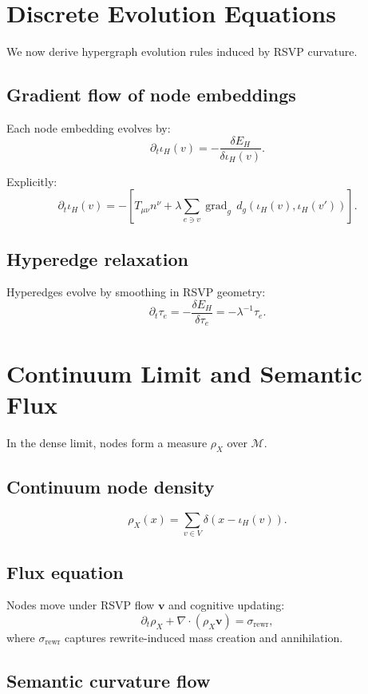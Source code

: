 \section{Discrete Evolution Equations}

We now derive hypergraph evolution rules induced by RSVP curvature.

\subsection{Gradient flow of node embeddings}

Each node embedding evolves by:
\[
\partial_t \iota_H(v)
=
-\frac{\delta E_H}{\delta \iota_H(v)}.
\]

Explicitly:
\[
\partial_t \iota_H(v)
=
-
\left[
T_{\mu\nu} n^\nu
+
\lambda 
\sum_{e\ni v}
\operatorname{grad}_g\,d_g(\iota_H(v),\iota_H(v'))
\right].
\]

\subsection{Hyperedge relaxation}

Hyperedges evolve by smoothing in RSVP geometry:
\[
\partial_t \tau_e
=
-\frac{\delta E_H}{\delta \tau_e}
=
-
\lambda^{-1}
\tau_e.
\]

\section{Continuum Limit and Semantic Flux}

In the dense limit, nodes form a measure $\rho_X$ over $\mathcal{M}$.

\subsection{Continuum node density}

\[
\rho_X(x)
=
\sum_{v\in V}\delta(x-\iota_H(v)).
\]

\subsection{Flux equation}

Nodes move under RSVP flow $\mathbf{v}$ and cognitive updating:
\[
\partial_t \rho_X
+
\nabla\cdot(\rho_X \mathbf{v})
=
\sigma_{\mathrm{rewr}},
\]
where $\sigma_{\mathrm{rewr}}$ captures rewrite-induced mass creation and
annihilation.

\subsection{Semantic curvature flow}

